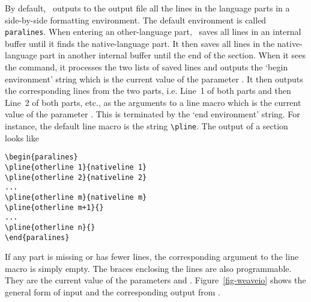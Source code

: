 By default, \weave\ outputs to the output file all the 
lines in the language parts in a side-by-side formatting environment.
The default environment is called {\tt paralines}. When entering an
other-language part, \weave\ saves all lines in an internal buffer
until it finds the native-language part. It then saves all lines in
the native-language part in
another internal buffer until the end of the section. When it sees the
 command, it processes the two lists of saved lines
and outputs the `begin environment' string which is the current value of
the parameter . It then outputs the corresponding
lines from the two parts, i.e. Line~1 of both parts and then Line~2 of
both parts, etc., as the arguments to a line macro which is the
current value of the parameter . This is terminated by
the `end environment' string. For instance, the
default line macro is the string \verb|\pline|. The output of a
section looks like
\begin{verbatim}
\begin{paralines}
\pline{otherline 1}{nativeline 1}
\pline{otherline 2}{nativeline 2}
...
\pline{otherline m}{nativeline m}
\pline{otherline m+1}{}
...
\pline{otherline n}{}
\end{paralines}
\end{verbatim}
If any part is missing or has fewer lines, the corresponding
argument to the line macro is simply empty. The braces enclosing the
lines are also programmable. They are the current value of the parameters
 and .
Figure~\ref{fig-weaveio} shows the general form of 
input and the corresponding output from \weave.
